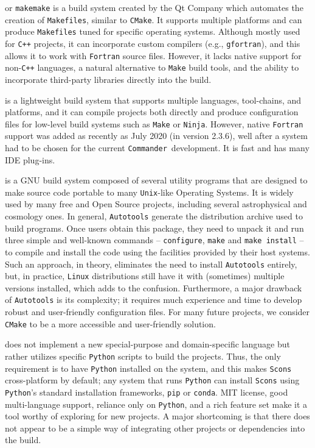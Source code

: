 \documentclass[twocolumn]{openjournal}
\def\commander{\texttt{Commander}}
\begin{document}
 or \texttt{makemake} is a build system created by the
Qt Company which automates the creation of \texttt{Makefiles}, similar to
\texttt{CMake}. It supports multiple platforms and can produce
\texttt{Makefiles} tuned for specific operating systems. Although mostly used
for \texttt{C++} projects, it can incorporate custom compilers (e.g.,
\texttt{gfortran}), and this allows it to work with \texttt{Fortran} source
files. However, it lacks native support for non-\texttt{C++} languages, a
natural alternative to \texttt{Make} build tools, and the ability to
incorporate third-party libraries directly into the build.

 is a lightweight build system that supports multiple
languages, tool-chains, and platforms, and it can compile projects both
directly and produce configuration files for low-level build systems such as
\texttt{Make} or \texttt{Ninja}. However, native \texttt{Fortran} support was
added as recently as July 2020 (in version 2.3.6), well after a system had to
be chosen for the current \commander\ development. It is fast and has many IDE
plug-ins.

 is a GNU build system composed of several
utility programs that are designed to make source code portable to many
\texttt{Unix}-like Operating Systems. It is widely used by many free and Open
Source projects, including several astrophysical and cosmology ones. In
general, \texttt{Autotools} generate the distribution archive used to build
programs. Once users obtain this package, they need to unpack it and run three
simple and well-known commands -- \texttt{configure}, \texttt{make} and
\texttt{make install} -- to compile and install the code using the facilities
provided by their host systems. Such an approach, in theory, eliminates the
need to install \texttt{Autotools} entirely, but, in practice, \texttt{Linux}
distributions still have it with (sometimes) multiple versions installed, which
adds to the confusion. Furthermore, a major drawback of \texttt{Autotools} is
its complexity; it requires much experience and time to develop robust and
user-friendly configuration files. For many future projects, we consider
\texttt{CMake} to be a more accessible and user-friendly solution.

 does not implement a new special-purpose and
domain-specific language but rather utilizes specific \texttt{Python} scripts
to build the projects. Thus, the only requirement is to have \texttt{Python}
installed on the system, and this makes \texttt{Scons} cross-platform by
default; any system that runs \texttt{Python} can install \texttt{Scons} using
\texttt{Python}'s standard installation frameworks, \texttt{pip} or
\texttt{conda}. MIT license, good multi-language support, reliance only on
\texttt{Python}, and a rich feature set make it a tool worthy of exploring for
new projects. A major shortcoming is that there does not appear to be a simple
way of integrating other projects or dependencies into the build.
\end{document}
